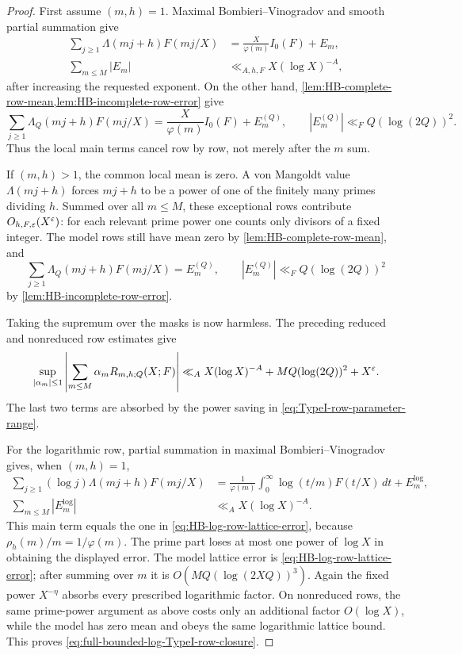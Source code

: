 \begin{proof}
First assume $(m,h)=1$.  Maximal Bombieri--Vinogradov and smooth partial
summation give
\begin{align}
 \sum_{j\geq1}\Lambda(mj+h)F(mj/X)
 &=\frac X{\varphi(m)}I_0(F)+E_m,
 \label{eq:prime-TypeI-row-main}\\
 \sum_{m\leq M}|E_m|
 &\ll_{A,h,F}X(\log X)^{-A},
 \label{eq:prime-TypeI-row-BV-error}
\end{align}
after increasing the requested exponent.  On the other hand,
\cref{lem:HB-complete-row-mean,lem:HB-incomplete-row-error} give
\begin{equation}
 \sum_{j\geq1}\Lambda_Q(mj+h)F(mj/X)
 =\frac X{\varphi(m)}I_0(F)+E_m^{(Q)},
 \qquad
 |E_m^{(Q)}|\ll_FQ(\log(2Q))^2.
 \label{eq:model-TypeI-row-main}
\end{equation}
Thus the local main terms cancel row by row, not merely after the $m$ sum.

If $(m,h)>1$, the common local mean is zero.  A von Mangoldt value
$\Lambda(mj+h)$ forces $mj+h$ to be a power of one of the finitely many
primes dividing $h$.  Summed over all $m\leq M$, these exceptional rows
contribute $O_{h,F,\varepsilon}(X^\varepsilon)$: for each relevant prime power one counts
only divisors of a fixed integer.  The model rows still have mean zero by
\cref{lem:HB-complete-row-mean}, and
\[
 \sum_{j\geq1}\Lambda_Q(mj+h)F(mj/X)=E_m^{(Q)},
 \qquad |E_m^{(Q)}|\ll_FQ(\log(2Q))^2
\]
by \cref{lem:HB-incomplete-row-error}.

Taking the supremum over the masks is now harmless.  The preceding
reduced and nonreduced row estimates give
\begin{equation}
 \sup_{|\alpha_m|\leq1}
 \left|\sum_{m\leq M}\alpha_mR_{m,h;Q}(X;F)\right|
 \ll_A X(\log X)^{-A}+MQ(\log(2Q))^2+X^\varepsilon.
 \label{eq:TypeI-row-two-errors}
\end{equation}
The last two terms are absorbed by the power saving in
\eqref{eq:TypeI-row-parameter-range}.

For the logarithmic row, partial summation in maximal
Bombieri--Vinogradov gives, when $(m,h)=1$,
\begin{align*}
 \sum_{j\geq1}(\log j)\Lambda(mj+h)F(mj/X)
 &={}
 \frac1{\varphi(m)}
 \int_0^\infty\log(t/m)F(t/X)\,dt+E_m^{\log},\\
 \sum_{m\leq M}|E_m^{\log}|
 &\ll_A X(\log X)^{-A}.
\end{align*}
This main term equals the one in \eqref{eq:HB-log-row-lattice-error},
because $\rho_h(m)/m=1/\varphi(m)$.  The prime part loses at most one
power of $\log X$ in obtaining the displayed error.  The model lattice error is
\eqref{eq:HB-log-row-lattice-error}; after summing over $m$ it is
$O(MQ(\log(2XQ))^3)$.  Again the fixed power $X^{-\eta}$ absorbs every
prescribed logarithmic factor.  On nonreduced rows, the same prime-power
argument as above costs only an additional factor $O(\log X)$, while the
model has zero mean and obeys the same logarithmic lattice bound.  This proves
\eqref{eq:full-bounded-log-TypeI-row-closure}.
\end{proof}

